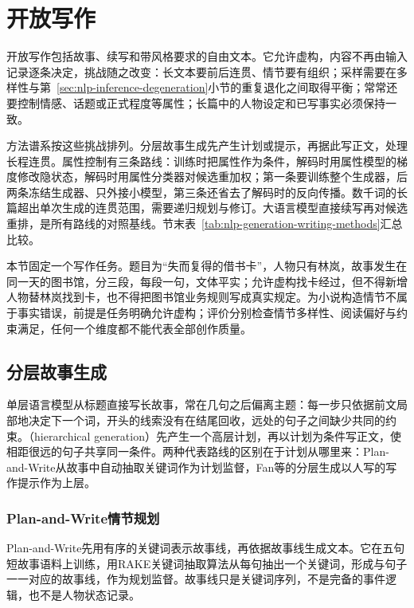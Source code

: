 \section{开放写作}
\label{sec:nlp-generation-open-writing}

开放写作包括故事、续写和带风格要求的自由文本。它允许虚构，内容不再由输入记录逐条决定，挑战随之改变：长文本要前后连贯、情节要有组织；采样需要在多样性与第~\ref{sec:nlp-inference-degeneration}小节的重复退化之间取得平衡；常常还要控制情感、话题或正式程度等属性；长篇中的人物设定和已写事实必须保持一致。

方法谱系按这些挑战排列。分层故事生成先产生计划或提示，再据此写正文，处理长程连贯。属性控制有三条路线：训练时把属性作为条件，解码时用属性模型的梯度修改隐状态，解码时用属性分类器对候选重加权；第一条要训练整个生成器，后两条冻结生成器、只外接小模型，第三条还省去了解码时的反向传播。数千词的长篇超出单次生成的连贯范围，需要递归规划与修订。大语言模型直接续写再对候选重排，是所有路线的对照基线。节末表~\ref{tab:nlp-generation-writing-methods}汇总比较。

本节固定一个写作任务。题目为“失而复得的借书卡”，人物只有林岚，故事发生在同一天的图书馆，分三段，每段一句，文体平实；允许虚构找卡经过，但不得新增人物替林岚找到卡，也不得把图书馆业务规则写成真实规定。为小说构造情节不属于事实错误，前提是任务明确允许虚构；评价分别检查情节多样性、阅读偏好与约束满足，任何一个维度都不能代表全部创作质量。

\subsection{分层故事生成}
\label{sec:nlp-generation-hierarchical-story}

单层语言模型从标题直接写长故事，常在几句之后偏离主题：每一步只依据前文局部地决定下一个词，开头的线索没有在结尾回收，远处的句子之间缺少共同的约束。（hierarchical generation）先产生一个高层计划，再以计划为条件写正文，使相距很远的句子共享同一条件。两种代表路线的区别在于计划从哪里来：Plan-and-Write从故事中自动抽取关键词作为计划监督，Fan等的分层生成以人写的写作提示作为上层。

\subsubsection{Plan-and-Write情节规划}
\label{sec:nlp-generation-plan-write}

Plan-and-Write先用有序的关键词表示故事线，再依据故事线生成文本。它在五句短故事语料上训练，用RAKE关键词抽取算法从每句抽出一个关键词，形成与句子一一对应的故事线，作为规划监督。故事线只是关键词序列，不是完备的事件逻辑，也不是人物状态记录。

